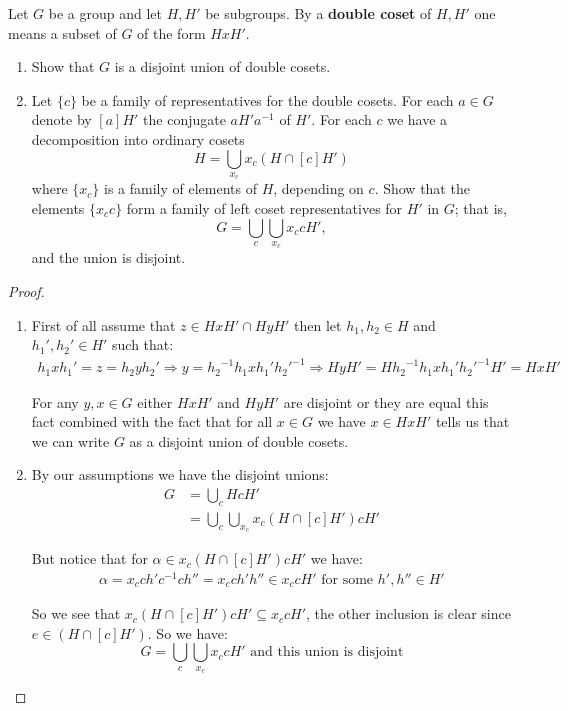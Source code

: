     \begin{exercise}
        Let $G$ be a group and let $H,H'$ be subgroups. By a \textbf{double coset} of $H,H'$ one means a subset of $G$ of the form $HxH'$.\begin{enumerate}[label = (\alph*)]
            \item Show that $G$ is a disjoint union of double cosets.
            \item Let $\{c\}$ be a family of representatives for the double cosets. For each $a\in G$ denote by $[a]H'$ the conjugate $aH'a^{-1}$ of $H'$. For each $c$ we have a decomposition into ordinary cosets\[H = \bigcup_{x_c} x_c(H\cap [c]H')\] where $\{x_c\}$ is a family of elements of $H$, depending on $c$. Show that the elements $\{{x_c}c\}$ form a family of left coset representatives for $H'$ in $G$; that is,\[G = \bigcup_{c}\bigcup_{x_c}{x_c}cH',\] and the union is disjoint.
        \end{enumerate}
    \begin{proof}
        \begin{enumerate}[label = (\alph*)]
            \item First of all assume that $z\in HxH'\cap HyH'$ then let $h_1,h_2\in H$ and $h_1', h_2'\in H'$ such that:\begin{align*}
                h_1xh_1' = z = h_2yh_2'\Rightarrow y = {h_2}^{-1}h_1xh_1'{h_2'}^{-1} \Rightarrow HyH' = H{h_2}^{-1}h_1xh_1'{h_2'}^{-1}H' = HxH'
            \end{align*} 

            For any $y,x\in G$ either $HxH'$ and $HyH'$ are disjoint or they are equal this fact combined with the fact that for all $x\in G$ we have $x\in HxH'$ tells us that we can write $G$ as a disjoint union of double cosets.

            \item  By our assumptions we have the disjoint unions:\begin{align*}
                G &= \bigcup_c HcH'\\
                  &= \bigcup_c\bigcup_{x_c}x_c(H\cap [c]H')cH'
            \end{align*}

            But notice that for $\alpha\in x_c(H\cap [c]H')cH'$ we have:\begin{align*}
                \alpha = {x_c}ch'c^{-1}ch'' = {x_c}ch'h''\in {x_c}cH' \text{ for some }h',h''\in H'  
            \end{align*}

            So we see that $x_c(H\cap [c]H')cH'\subseteq {x_c}cH'$, the other inclusion is clear since $e\in (H\cap [c]H')$. So we have:\begin{equation*}
                G = \bigcup_c\bigcup_{x_c}{x_c}cH' \text{ and this union is disjoint} 
            \end{equation*}
        \end{enumerate}
    \end{proof}
    \end{exercise}

